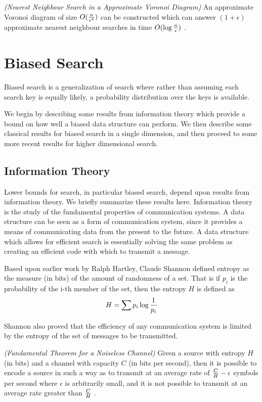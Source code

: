 \documentclass[mcs]{scsthesis}
\begin{document}
\begin{thm} \emph{(Nearest Neighbour Search in a Approximate Voronoi Diagram)} 
An approximate Voronoi diagram of size \(O({n \over \epsilon ^ d})\) can be
constructed which can answer \((1 + \epsilon)\) approximate nearest neighbour
searches in time \(O(\log {n \over \epsilon})\) \cite{arya-avd}.
\end{thm}

\section{Biased Search}

Biased search is a generalization of search where rather than assuming each
search key is equally likely, a probability distribution over the keys is
available.

We begin by describing some results from information theory which provide a
bound on how well a biased data structure can perform. We then describe some
classical results for biased search in a single dimension, and then proceed
to some more recent results for higher dimensional search.

\subsection{Information Theory}

Lower bounds for search, in particular biased search, depend upon results from
information theory. We briefly summarize these results here.  Information theory
is the study of the fundamental properties of communication systems. A data
structure can be seen as a form of communication system, since it provides a
means of communicating data from the present to the future.  A data structure
which allows for efficient search is essentially solving the same problem as
creating an efficient code with which to transmit a message.

Based upon earlier work by Ralph Hartley, Claude Shannon \cite{claudeshannonwasagod}
defined entropy as the measure (in bits) of the amount of randomness of a set.
That is if \(p_i\) is the probability of the i-th member of the set, then the
entropy \(H\) is defined as
$$
H = \sum{ p_i \log{1 \over p_i}}
$$

Shannon also proved that the efficiency of any communication system is limited
by the entropy of the set of messages to be transmitted.

\begin{thm} \emph{(Fundamental Theorem for a Noiseless Channel)} 
Given a source with entropy \(H\) (in bits) and a channel with capacity \(C\)
(in bits per second), then it is possible to encode a source in such a way as to
transmit at an average rate of \({C \over H} - \epsilon\) symbols per second
where \(\epsilon\) is arbitrarily small, and it is not possible to transmit
at an average rate greater than \(C \over H\) \cite{claudeshannonwasagod}.
\end{thm}
\end{document}
